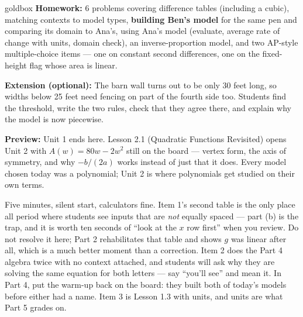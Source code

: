 \documentclass[10pt]{article}
\begin{document}
\begin{skillbox}{goldbox}
\textbf{Homework:} 6 problems covering difference tables (including a cubic),
matching contexts to model types, \textbf{building Ben's model} for the same pen
and comparing its domain to Ana's, using Ana's model (evaluate, average rate of
change with units, domain check), an inverse-proportion model, and two AP-style
multiple-choice items --- one on constant second differences, one on the
fixed-height flag whose area is linear.

\textbf{Extension (optional):} The barn wall turns out to be only 30 feet long,
so widths below 25 feet need fencing on part of the fourth side too. Students
find the threshold, write the two rules, check that they agree there, and
explain why the model is now piecewise.

\textbf{Preview:} Unit 1 ends here. Lesson 2.1 (Quadratic Functions Revisited)
opens Unit 2 with $A(w) = 80w - 2w^2$ still on the board --- vertex form, the
axis of symmetry, and why $-b/(2a)$ works instead of just that it does. Every
model chosen today was a polynomial; Unit 2 is where polynomials get studied on
their own terms.
\end{skillbox}

\begin{teachernote}[Warm-Up]
Five minutes, silent start, calculators fine. Item 1's second table is the only
place all period where students see inputs that are \textit{not} equally spaced
--- part (b) is the trap, and it is worth ten seconds of ``look at the $x$ row
first'' when you review. Do not resolve it here; Part 2 rehabilitates that table
and shows $g$ was linear after all, which is a much better moment than a
correction. Item 2 does the Part 4 algebra twice with no context attached, and
students will ask why they are solving the same equation for both letters ---
say ``you'll see'' and mean it. In Part 4, put the warm-up back on the board:
they built both of today's models before either had a name. Item 3 is Lesson 1.3
with units, and units are what Part 5 grades on.
\end{teachernote}
\end{document}
